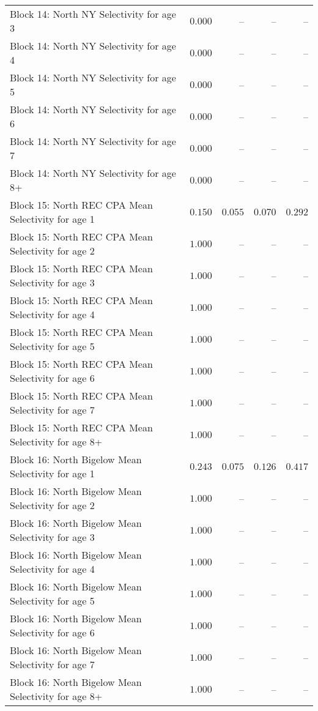 \documentclass[
]{article}
\begin{document}
\begin{landscape}
\begin{longtable}[t]{lrrrr}
Block 14: North NY Selectivity for age 3 & $0.000$ & -- & -- & --\\
\addlinespace
Block 14: North NY Selectivity for age 4 & $0.000$ & -- & -- & --\\
Block 14: North NY Selectivity for age 5 & $0.000$ & -- & -- & --\\
Block 14: North NY Selectivity for age 6 & $0.000$ & -- & -- & --\\
Block 14: North NY Selectivity for age 7 & $0.000$ & -- & -- & --\\
Block 14: North NY Selectivity for age 8+ & $0.000$ & -- & -- & --\\
\addlinespace
Block 15: North REC CPA Mean Selectivity for age 1 & $0.150$ & $0.055$ & $0.070$ & $0.292$\\
Block 15: North REC CPA Mean Selectivity for age 2 & $1.000$ & -- & -- & --\\
Block 15: North REC CPA Mean Selectivity for age 3 & $1.000$ & -- & -- & --\\
Block 15: North REC CPA Mean Selectivity for age 4 & $1.000$ & -- & -- & --\\
Block 15: North REC CPA Mean Selectivity for age 5 & $1.000$ & -- & -- & --\\
\addlinespace
Block 15: North REC CPA Mean Selectivity for age 6 & $1.000$ & -- & -- & --\\
Block 15: North REC CPA Mean Selectivity for age 7 & $1.000$ & -- & -- & --\\
Block 15: North REC CPA Mean Selectivity for age 8+ & $1.000$ & -- & -- & --\\
Block 16: North Bigelow Mean Selectivity for age 1 & $0.243$ & $0.075$ & $0.126$ & $0.417$\\
Block 16: North Bigelow Mean Selectivity for age 2 & $1.000$ & -- & -- & --\\
\addlinespace
Block 16: North Bigelow Mean Selectivity for age 3 & $1.000$ & -- & -- & --\\
Block 16: North Bigelow Mean Selectivity for age 4 & $1.000$ & -- & -- & --\\
Block 16: North Bigelow Mean Selectivity for age 5 & $1.000$ & -- & -- & --\\
Block 16: North Bigelow Mean Selectivity for age 6 & $1.000$ & -- & -- & --\\
Block 16: North Bigelow Mean Selectivity for age 7 & $1.000$ & -- & -- & --\\
\addlinespace
Block 16: North Bigelow Mean Selectivity for age 8+ & $1.000$ & -- & -- & --\\

\end{longtable}
\end{landscape}
\end{document}
